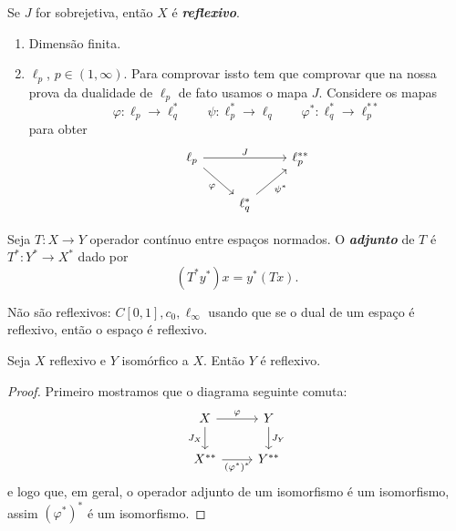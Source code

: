 \documentclass[portuguese]{article}
\theoremstyle{definition}
\begin{document}
	\begin{defn}
		Se $J$ for sobrejetiva, então $X$ é \textbf{\textit{reflexivo}}.
	\end{defn}
	\begin{exemplos}\leavevmode
		\begin{enumerate}
			\item Dimensão finita.
			\item $\ell_p$, $p\in(1,\infty)$. Para comprovar issto tem que comprovar que na nossa prova da dualidade de $\ell_p$ de fato usamos o mapa $J$. Considere os mapas
			\[\varphi:\ell_p\to\ell_q^*\qquad\psi:\ell_p^*\to\ell_q\qquad\varphi^*:\ell_q^*\to\ell_p^{**}\] para obter
			\[\begin{tikzcd}
				\ell_p\arrow[rr,"J"]\arrow[rd,swap,"\varphi"]&&\ell_p^{**}\\
				&\ell_q^{*}\arrow[ur,"\psi^*",swap]
			\end{tikzcd}\]
		\end{enumerate}
	\end{exemplos}
	
	\begin{defn}
		Seja $T:X\to Y$ operador contínuo entre espaços normados. O \textbf{\textit{adjunto}} de $T$ é $T^*:Y^*\to X^*$ dado por
		\[(T^*y^*)x=y^*(Tx).\]
	\end{defn}
	
	\begin{exemplos}
		Não são reflexivos: $C[0,1],c_0,\ell_\infty$ usando que se o dual de um espaço é reflexivo, então o espaço é reflexivo.
	\end{exemplos}
	
	\begin{exer*}
		Seja $X$ reflexivo e $Y$ isomórfico a $X$. Então $Y$ é reflexivo.
	\end{exer*}
	\begin{proof}
		Primeiro mostramos que o diagrama seguinte comuta:
		\[\begin{tikzcd}
			X\arrow[r,"\varphi"]\arrow[d,swap,"J_X"]&Y\arrow[d,"J_Y"]\\
			X^{**}\arrow[r,"(\varphi^{*})^*",swap]&Y^{**}
		\end{tikzcd}\]
		e logo que, em geral, o operador adjunto de um isomorfismo é um isomorfismo, assim $(\varphi^*)^*$ é um isomorfismo.
	\end{proof}
	
\end{document}
